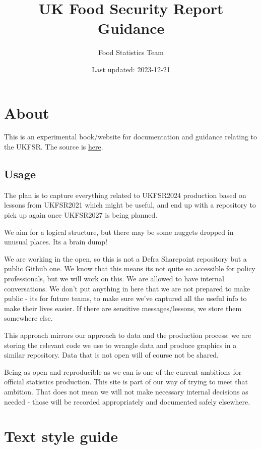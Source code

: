 \documentclass[
]{book}
\title{UK Food Security Report Guidance}
\author{Food Statistics Team}
\date{Last updated: 2023-12-21}
\begin{document}
\maketitle

{
\setcounter{tocdepth}{1}
\tableofcontents
}
\hypertarget{about}{%
\chapter{About}\label{about}}

This is an experimental book/website for documentation and guidance relating to the UKFSR. The source is \href{https://github.com/FoodchainStats/ukfsr-docs}{here}.

\hypertarget{usage}{%
\section{Usage}\label{usage}}

The plan is to capture everything related to UKFSR2024 production based on lessons from UKFSR2021 which might be useful, and end up with a repository to pick up again once UKFSR2027 is being planned.

We aim for a logical structure, but there may be some nuggets dropped in unusual places. Its a brain dump!

We are working in the open, so this is not a Defra Sharepoint repository but a public Github one. We know that this means its not quite so accessible for policy professionals, but we will work on this. We are allowed to have internal conversations. We don't put anything in here that we are not prepared to make public - its for future teams, to make sure we've captured all the useful info to make their lives easier. If there are sensitive messages/lessons, we store them somewhere else.

This approach mirrors our approach to data and the production process: we are storing the relevant code we use to wrangle data and produce graphics in a similar repository. Data that is not open will of course not be shared.

Being as open and reproducible as we can is one of the current ambitions for official statistics production. This site is part of our way of trying to meet that ambition. That does not mean we will not make necessary internal decisions as needed - those will be recorded appropriately and documented safely elsewhere.

\hypertarget{text}{%
\chapter{Text style guide}\label{text}}
\end{document}
